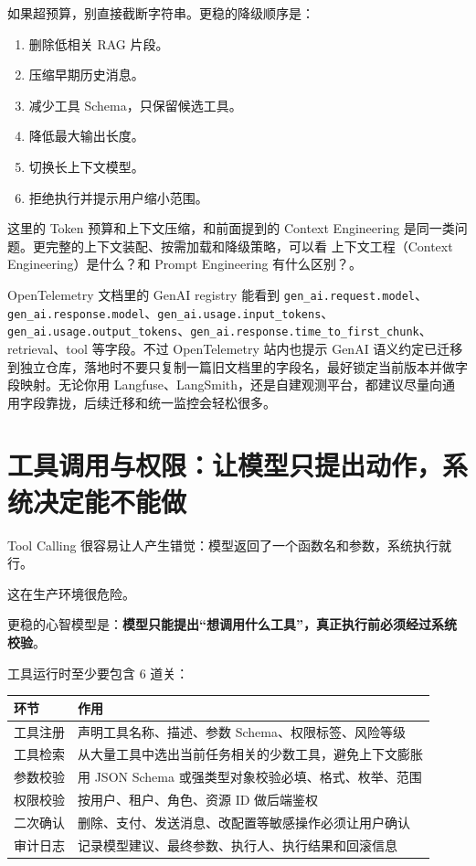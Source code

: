 \documentclass[10pt,a4paper]{ctexart}
\begin{document}
如果超预算，别直接截断字符串。更稳的降级顺序是：


\begin{enumerate}[itemsep=2pt, topsep=4pt]
  \item 删除低相关 RAG 片段。
  \item 压缩早期历史消息。
  \item 减少工具 Schema，只保留候选工具。
  \item 降低最大输出长度。
  \item 切换长上下文模型。
  \item 拒绝执行并提示用户缩小范围。
\end{enumerate}


这里的 Token 预算和上下文压缩，和前面提到的 Context Engineering 是同一类问题。更完整的上下文装配、按需加载和降级策略，可以看 上下文工程（Context Engineering）是什么？和 Prompt Engineering 有什么区别？。



OpenTelemetry 文档里的 GenAI registry 能看到 \texttt{gen\_ai.request.model}、\texttt{gen\_ai.response.model}、\texttt{gen\_ai.usage.input\_tokens}、\texttt{gen\_ai.usage.output\_tokens}、\texttt{gen\_ai.response.time\_to\_first\_chunk}、retrieval、tool 等字段。不过 OpenTelemetry 站内也提示 GenAI 语义约定已迁移到独立仓库，落地时不要只复制一篇旧文档里的字段名，最好锁定当前版本并做字段映射。无论你用 Langfuse、LangSmith，还是自建观测平台，都建议尽量向通用字段靠拢，后续迁移和统一监控会轻松很多。



\section{工具调用与权限：让模型只提出动作，系统决定能不能做}


Tool Calling 很容易让人产生错觉：模型返回了一个函数名和参数，系统执行就行。



这在生产环境很危险。



更稳的心智模型是：\textbf{模型只能提出“想调用什么工具”，真正执行前必须经过系统校验}。



工具运行时至少要包含 6 道关：


{\footnotesize
\begin{tabularx}{\textwidth}{|X|X|}
\hline
\textbf{环节} & \textbf{作用} \\
\hline
工具注册 & 声明工具名称、描述、参数 Schema、权限标签、风险等级 \\
\hline
工具检索 & 从大量工具中选出当前任务相关的少数工具，避免上下文膨胀 \\
\hline
参数校验 & 用 JSON Schema 或强类型对象校验必填、格式、枚举、范围 \\
\hline
权限校验 & 按用户、租户、角色、资源 ID 做后端鉴权 \\
\hline
二次确认 & 删除、支付、发送消息、改配置等敏感操作必须让用户确认 \\
\hline
审计日志 & 记录模型建议、最终参数、执行人、执行结果和回滚信息 \\
\hline
\end{tabularx}
}
\end{document}
